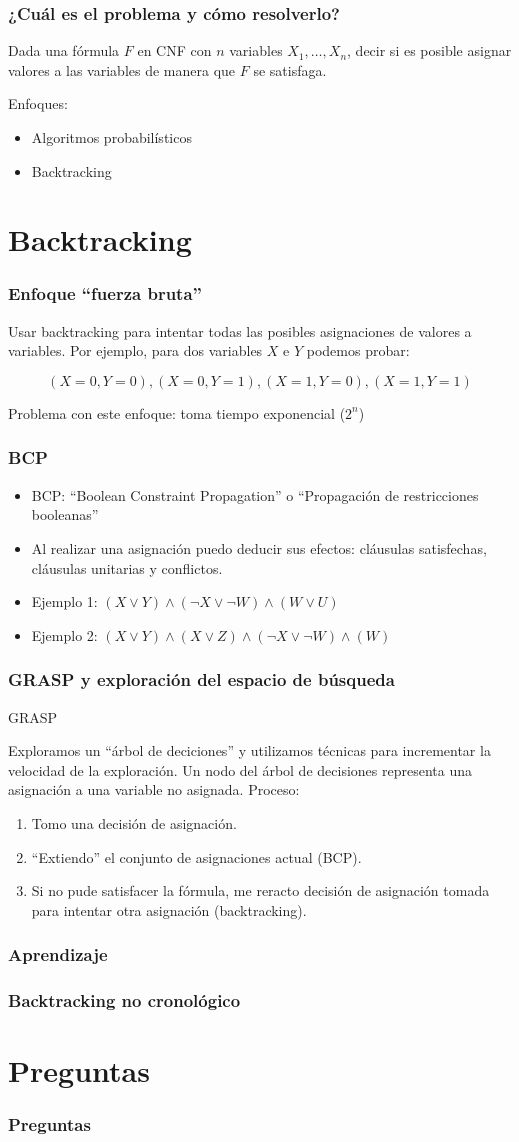 \documentclass{beamer}
\begin{document}
\frame
{
  \frametitle{¿Cuál es el problema y cómo resolverlo?}

  Dada una fórmula $F$ en CNF con $n$ variables $X_1, \ldots, X_n$, decir si es
  posible asignar valores a las variables de manera que $F$ se satisfaga.

  Enfoques:

  \begin{itemize}
  \item Algoritmos probabilísticos
  \item Backtracking
  \end{itemize}
}

\section{Backtracking}

\frame
{
  \frametitle{Enfoque ``fuerza bruta''}

  Usar backtracking para intentar todas las posibles asignaciones de valores a variables. Por
  ejemplo, para dos variables $X$ e $Y$ podemos probar:

  $$
  (X=0,Y=0), (X=0,Y=1), (X=1,Y=0), (X=1,Y=1)
  $$

  Problema con este enfoque: toma tiempo exponencial ($2^n$)
}

\frame
{
  \frametitle{BCP}

  \begin{itemize}
   \item BCP: ``Boolean Constraint Propagation'' o ``Propagación de restricciones booleanas''
   \item Al realizar una asignación puedo deducir sus efectos: cláusulas satisfechas, cláusulas unitarias y conflictos.
   \item Ejemplo 1: $(X \vee Y) \wedge (\neg X \vee \neg W) \wedge (W \vee U)$
   \item Ejemplo 2: $(X \vee Y) \wedge (X \vee Z) \wedge (\neg X \vee \neg W) \wedge (W)$
  \end{itemize}
}

\frame
{
  \frametitle{GRASP y exploración del espacio de búsqueda}

  GRASP

  Exploramos un ``árbol de deciciones'' y utilizamos técnicas
  para incrementar la velocidad de la exploración. Un nodo del árbol
  de decisiones representa una asignación a una variable no asignada.
  Proceso:

  \begin{enumerate}
   \item Tomo una decisión de asignación.
   \item ``Extiendo'' el conjunto de asignaciones actual (BCP).
   \item Si no pude satisfacer la fórmula, me reracto decisión de asignación tomada para intentar
         otra asignación (backtracking).
  \end{enumerate}
}

\frame
{
  \frametitle{Aprendizaje}
}

\frame
{
  \frametitle{Backtracking no cronológico}
}

\section{Preguntas}

\frame
{
  \frametitle{Preguntas}
}
\end{document}
